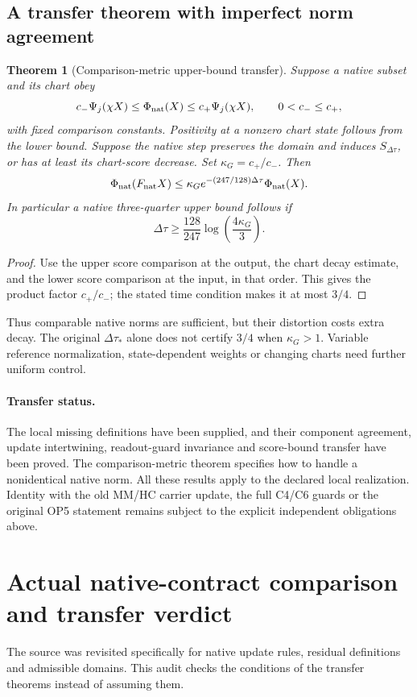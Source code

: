 \documentclass[11pt,a4paper]{article}
\newtheorem{theorem}{Theorem}
\begin{document}
\subsection{A transfer theorem with imperfect norm agreement}
\begin{theorem}[Comparison-metric upper-bound transfer]
\label{thm:metric-comparison-transfer}
Suppose a native subset and its chart obey
\[
 c_-\Psi_j(\chi X)\le\Phi_{\rm nat}(X)
\le c_+\Psi_j(\chi X),\qquad 0<c_-\le c_+,
\]
with fixed comparison constants. Positivity at a nonzero chart state
follows from the lower bound. Suppose the native step preserves
the domain and induces $S_{\Delta\tau}$, or has at least its chart-score
decrease. Set $\kappa_G=c_+/c_-$. Then
\[
\Phi_{\rm nat}(F_{\rm nat}X)
\le\kappa_G e^{-(247/128)\Delta\tau}\Phi_{\rm nat}(X).
\]
In particular a native three-quarter upper bound follows if
\[
\Delta\tau\ge\frac{128}{247}\log\left(\frac{4\kappa_G}{3}\right).
\]
\end{theorem}
\begin{proof}
Use the upper score comparison at the output, the chart decay estimate,
and the lower score comparison at the input, in that order. This gives
the product factor $c_+/c_-$; the stated time condition makes it at most
$3/4$.
\end{proof}
Thus comparable native norms are sufficient, but their distortion costs
extra decay. The original $\Delta\tau_*$ alone does not certify $3/4$
when $\kappa_G>1$. Variable reference normalization, state-dependent
weights or changing charts need further uniform control.

\paragraph{Transfer status.}
The local missing definitions have been supplied, and their component
agreement, update intertwining, readout-guard invariance and score-bound
transfer have been proved. The comparison-metric theorem specifies how
to handle a nonidentical native norm. All these results apply to the
declared local realization. Identity with the old MM/HC carrier update,
the full C4/C6 guards or the original OP5 statement remains subject to the
explicit independent obligations above.

\section{Actual native-contract comparison and transfer verdict}
\label{sec:native-contract-verdict}
The source was revisited specifically for native update rules, residual
definitions and admissible domains. This audit checks the conditions of
the transfer theorems instead of assuming them.
\end{document}
